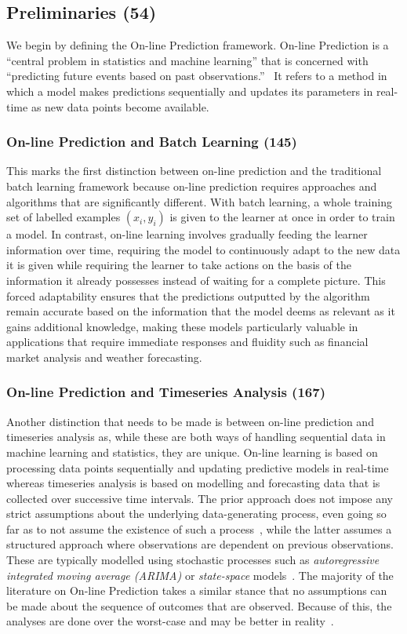 \subsection{Preliminaries (54)}
We begin by defining the On-line Prediction framework. On-line Prediction is a ``central problem in statistics and machine learning'' that is concerned with ``predicting future events based on past observations.''~\cite{cesa-bianchi:1997} It refers to a method in which a model makes predictions sequentially and updates its parameters in real-time as new data points become available.

\subsubsection*{On-line Prediction and Batch Learning (145)}
This marks the first distinction between on-line prediction and the traditional batch learning framework because on-line prediction requires approaches and algorithms that are significantly different. With batch learning, a whole training set of labelled examples $(x_i, y_i)$ is given to the learner at once in order to train a model. In contrast, on-line learning involves gradually feeding the learner information over time, requiring the model to continuously adapt to the new data it is given while requiring the learner to take actions on the basis of the information it already possesses instead of waiting for a complete picture. \cite{kalnishkan:2015} This forced adaptability ensures that the predictions outputted by the algorithm remain accurate based on the information that the model deems as relevant as it gains additional knowledge, making these models particularly valuable in applications that require immediate responses and fluidity such as financial market analysis and weather forecasting.

\subsubsection*{On-line Prediction and Timeseries Analysis (167)}
Another distinction that needs to be made is between on-line prediction and timeseries analysis as, while these are both ways of handling sequential data in machine learning and statistics, they are unique. On-line learning is based on processing data points sequentially and updating predictive models in real-time whereas timeseries analysis is based on modelling and forecasting data that is collected over successive time intervals. The prior approach does not impose any strict assumptions about the underlying data-generating process, even going so far as to not assume the existence of such a process~\cite{vovk:2001}, while the latter assumes a structured approach where observations are dependent on previous observations. These are typically modelled using stochastic processes such as \textit{autoregressive integrated moving average (ARIMA)} or \textit{state-space} models~\cite{box:2015}. The majority of the literature on On-line Prediction takes a similar stance that no assumptions can be made about the sequence of outcomes that are observed. Because of this, the analyses are done over the worst-case and may be better in reality~\cite{cesa-bianchi:1997}.

